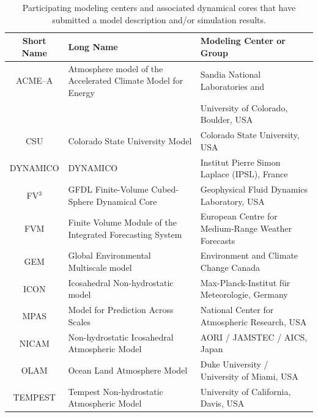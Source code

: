 \documentclass[gmd, manuscript]{copernicus}
\begin{document}
\begin{table}[p]
\caption{Participating modeling centers and associated dynamical cores that have submitted a model description and/or simulation results.} \label{tab:Models}
\begin{center}
\begin{tabular}{cll}
\hline Short Name & Long Name & Modeling Center or Group \\ \hline 
ACME--A & Atmosphere model of the Accelerated Climate Model for Energy & Sandia National Laboratories and \\
& & University of Colorado, Boulder, USA \\
CSU & Colorado State University Model & Colorado State University, USA \\
DYNAMICO & DYNAMICO & Institut Pierre Simon Laplace (IPSL), France \\
FV$^3$ & GFDL Finite-Volume Cubed-Sphere Dynamical Core & Geophysical Fluid Dynamics Laboratory, USA \\
FVM & Finite Volume Module of the Integrated Forecasting System & European Centre for Medium-Range Weather Forecasts \\
GEM & Global Environmental Multiscale model & Environment and Climate Change Canada \\
ICON & Icosahedral Non-hydrostatic model & Max-Planck-Institut f\"ur Meteorologie, Germany \\
MPAS & Model for Prediction Across Scales & National Center for Atmospheric Research, USA \\
NICAM & Non-hydrostatic Icosahedral Atmospheric Model & AORI / JAMSTEC / AICS, Japan \\
OLAM & Ocean Land Atmosphere Model & Duke University / University of Miami, USA \\
TEMPEST & Tempest Non-hydrostatic Atmospheric Model & University of California, Davis, USA \\
\hline 
\end{tabular}
\end{center}
\end{table}
\end{document}
